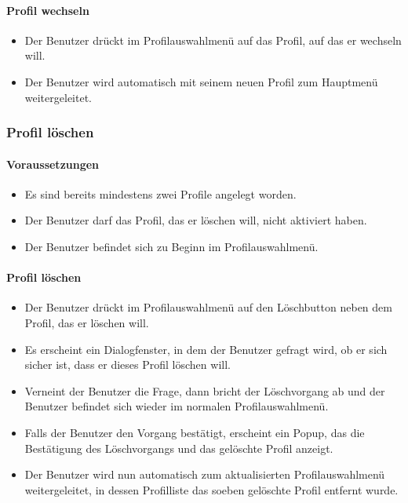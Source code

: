 \paragraph{Profil wechseln}
\begin{itemize}
	\item Der Benutzer drückt im Profilauswahlmenü auf das Profil, auf das er wechseln will.
	\item Der Benutzer wird automatisch mit seinem neuen Profil zum Hauptmenü weitergeleitet.
\end{itemize}

\subsubsection{Profil löschen}
\paragraph{Voraussetzungen}
\begin{itemize}
	\item Es sind bereits mindestens zwei Profile angelegt worden.
	\item Der Benutzer darf das Profil, das er löschen will, nicht aktiviert haben.
	\item Der Benutzer befindet sich zu Beginn im Profilauswahlmenü.
\end{itemize}
\paragraph{Profil löschen}
\begin{itemize}
	\item Der Benutzer drückt im Profilauswahlmenü auf den Löschbutton neben dem Profil, das er löschen will.
	\item Es erscheint ein Dialogfenster, in dem der Benutzer gefragt wird, ob er sich sicher ist, dass er dieses Profil löschen will.
	\item Verneint der Benutzer die Frage, dann bricht der Löschvorgang ab und der Benutzer befindet sich wieder im normalen Profilauswahlmenü.
	\item Falls der Benutzer den Vorgang bestätigt, erscheint ein Popup, das die Bestätigung des Löschvorgangs und das gelöschte Profil anzeigt.
	\item Der Benutzer wird nun automatisch zum aktualisierten Profilauswahlmenü weitergeleitet, in dessen Profilliste das soeben gelöschte Profil entfernt wurde.
\end{itemize}

